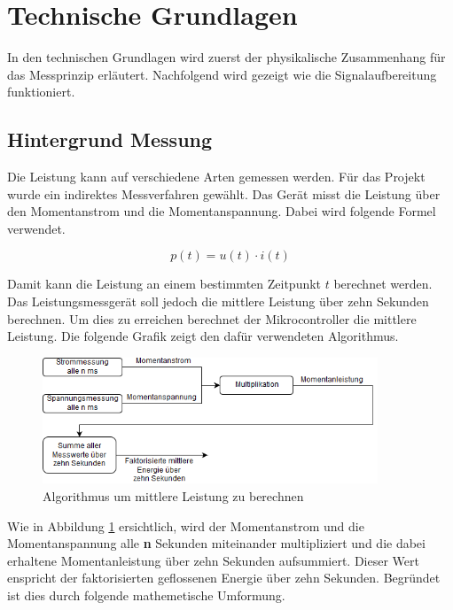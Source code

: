 \section{Technische Grundlagen}
In den technischen Grundlagen wird zuerst der physikalische Zusammenhang für das Messprinzip erläutert. Nachfolgend wird gezeigt wie die Signalaufbereitung funktioniert.

\subsection{Hintergrund Messung}%
Die Leistung kann auf verschiedene Arten gemessen werden. Für das Projekt wurde ein indirektes Messverfahren gewählt. Das Gerät misst die Leistung über den Momentanstrom und die Momentanspannung. Dabei wird folgende Formel verwendet.

\begin{equation}
	p(t) = u(t) \cdot i(t)
\end{equation}
\label{eq:Momentanleistung}

Damit kann die Leistung an einem bestimmten Zeitpunkt $t$ berechnet werden. Das Leistungsmessgerät soll jedoch die mittlere Leistung über zehn Sekunden berechnen. Um dies zu erreichen berechnet der Mikrocontroller die mittlere Leistung. Die folgende Grafik zeigt den dafür verwendeten Algorithmus.
\begin{figure}[H]
\begin{center}
	\includegraphics[width=100mm]{images/messung_schematisch.png}
	\caption{Algorithmus um mittlere Leistung zu berechnen} %
	\label{fig:berechnung_P}
\end{center}
\end{figure}

Wie in Abbildung \ref{fig:berechnung_P} ersichtlich, wird der Momentanstrom und die Momentanspannung alle \textbf{n} Sekunden miteinander multipliziert und die dabei erhaltene Momentanleistung über zehn Sekunden aufsummiert. Dieser Wert enspricht der faktorisierten geflossenen Energie über zehn Sekunden. Begründet ist dies durch folgende mathemetische Umformung.

